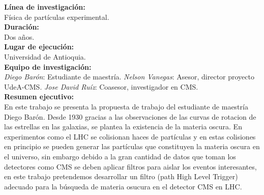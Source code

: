 \textbf{Línea de investigación:}\\
Física de partículas experimental.
\\

\textbf{Duración:}\\
Dos años.
\\

\textbf{Lugar de ejecución:}\\
Universidad de Antioquia.
\\

\textbf{Equipo de investigación:}\\
\emph{Diego Barón}: Estudiante de maestría.
\emph{Nelson Vanegas}: Asesor, director proyecto UdeA-CMS.
\emph{Jose David Ruíz}: Coasesor, investigador en CMS.
\\

\textbf{Resumen ejecutivo:}\\
En este trabajo se presenta la propuesta de trabajo del estudiante de maestría Diego Barón. Desde 1930 gracias a las observaciones de las curvas de rotacion de las estrellas en las galaxias, se plantea la existencia de la materia oscura. En experimentos como el LHC se colisionan haces de partículas y en estas colisiones en principio se pueden generar las partículas que constituyen la materia oscura en el universo, sin embargo debido a la gran cantidad de datos que toman los detectores como CMS se deben aplicar filtros para aislar los eventos interesantes, en este trabajo pretendemos desarrollar un filtro (path High Level Trigger) adecuado para la búsqueda de materia osucura en el detector CMS en LHC.


\newpage























